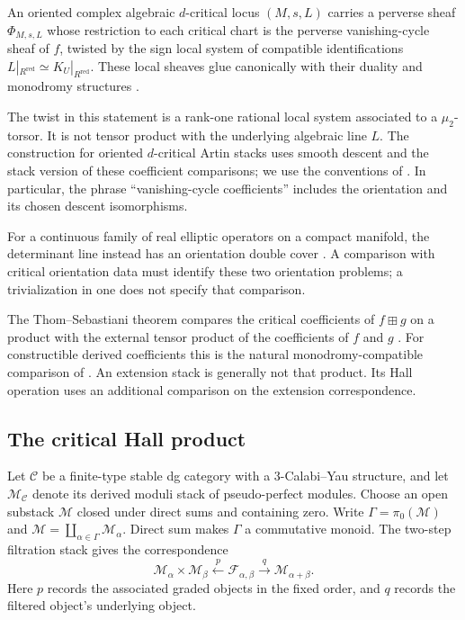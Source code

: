 \begin{theorem}
\label{thm:bbdjs}
An oriented complex algebraic $d$-critical locus $(M,s,L)$ carries a
perverse sheaf $\Phi_{M,s,L}$ whose restriction to each critical chart
is the perverse vanishing-cycle sheaf of $f$, twisted by the sign local
system of compatible identifications
$L|_{R^{\mathrm{red}}}\simeq K_U|_{R^{\mathrm{red}}}$.
These local sheaves glue canonically with their duality and monodromy
structures \cite[Theorem~6.9]{BBDJS2015}.
\end{theorem}

The twist in this statement is a rank-one rational local system
associated to a $\mu_2$-torsor. It is not tensor product with the
underlying algebraic line $L$. The construction for oriented
$d$-critical Artin stacks uses smooth descent and the stack version
of these coefficient comparisons; we use the conventions of
\cite[\S4]{KinjoParkSafronovCoHA}. In particular, the phrase
``vanishing-cycle coefficients'' includes the orientation and its
chosen descent isomorphisms.

For a continuous family of real elliptic operators on a compact
manifold, the determinant line instead has an orientation double
cover \cite[Definition~1.2]{JoyceTanakaUpmeier}. A comparison with
critical orientation data must identify these two orientation
problems; a trivialization in one does not specify that comparison.

The Thom--Sebastiani theorem compares the critical coefficients of
$f\boxplus g$ on a product with the external tensor product of the
coefficients of $f$ and $g$ \cite[Theorem~2.13]{BBDJS2015}.
For constructible derived coefficients this is the natural
monodromy-compatible comparison of \cite[\S0]{MasseyST}.
An extension stack is generally not that product. Its Hall operation
uses an additional comparison on the extension correspondence.

\subsection{The critical Hall product}
\label{app:hall-product}

Let $\mathcal C$ be a finite-type stable dg category with a
$3$-Calabi--Yau structure, and let $\mathcal M_{\mathcal C}$ denote
its derived moduli stack of pseudo-perfect modules. Choose an open
substack $\mathcal M$ closed under direct sums and containing zero.
Write $\Gamma=\pi_0(\mathcal M)$ and
$\mathcal M=\coprod_{\alpha\in\Gamma}\mathcal M_\alpha$.
Direct sum makes $\Gamma$ a commutative monoid.
The two-step filtration stack gives the correspondence
\[
 \mathcal M_\alpha\times\mathcal M_\beta
 \xleftarrow{\ p\ }\mathcal F_{\alpha,\beta}
 \xrightarrow{\ q\ }\mathcal M_{\alpha+\beta}.
\]
Here $p$ records the associated graded objects in the fixed order,
and $q$ records the filtered object's underlying object.

